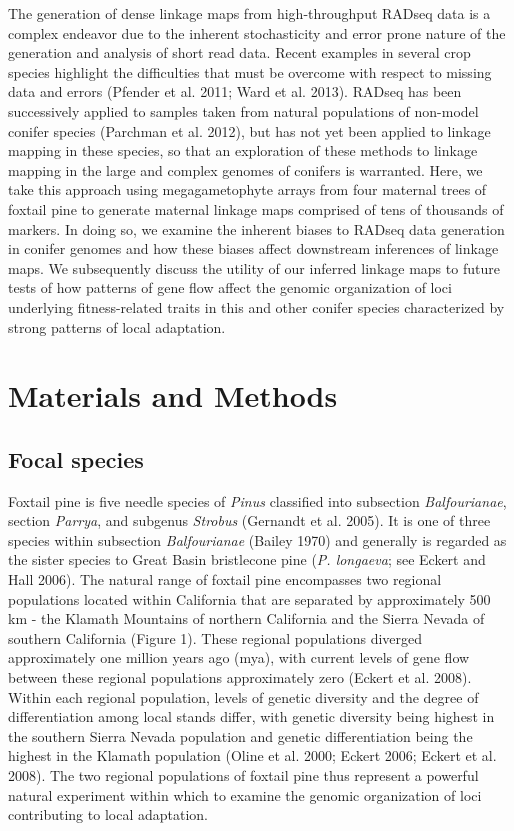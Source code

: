 \documentclass[11pt]{article}
\begin{document}
The generation of dense linkage maps from high-throughput RADseq data is a complex endeavor due to the inherent stochasticity
and error prone nature of the generation and analysis of short read data. Recent examples in several crop species highlight the
difficulties that must be overcome with respect to missing data and errors (Pfender et al. 2011; Ward et al. 2013). RADseq has been 
successively applied to samples taken from natural populations of non-model conifer species (Parchman et al. 2012), but has not yet 
been applied to linkage mapping in these species, so that an exploration of these methods to linkage mapping in the large and complex 
genomes of conifers is warranted. Here, we take this approach using megagametophyte arrays from four maternal trees of foxtail pine
to generate maternal linkage maps comprised of tens of thousands of markers. In doing so, we examine the inherent biases
to RADseq data generation in conifer genomes and how these biases affect downstream inferences of linkage maps. We subsequently discuss
the utility of our inferred linkage maps to future tests of how patterns of gene flow affect the genomic organization 
of loci underlying fitness-related traits in this and other conifer species characterized by strong patterns of local adaptation.


\section*{Materials and Methods}

\subsection*{Focal species}
Foxtail pine is five needle species of \textit{Pinus} classified into 
subsection \textit{Balfourianae}, section \textit{Parrya}, and subgenus \textit{Strobus} 
(Gernandt et al. 2005). It is one of three species within subsection \textit{Balfourianae} 
(Bailey 1970) and generally is regarded as the sister species to Great Basin bristlecone pine (\textit{P. longaeva}; see 
Eckert and Hall 2006). The natural range of foxtail pine encompasses two 
regional populations located within California that are separated by approximately 500 km - 
the Klamath Mountains of northern California and the Sierra Nevada of southern California 
(Figure 1). These regional populations diverged approximately one million years ago (mya), 
with current levels of gene flow between these regional populations approximately zero 
(Eckert et al. 2008). Within each regional population, levels of genetic diversity and the 
degree of differentiation among local stands differ, with genetic diversity being highest in 
the southern Sierra Nevada population and genetic differentiation being the highest in the 
Klamath population (Oline et al. 2000; Eckert 2006; Eckert et al. 2008). The two regional 
populations of foxtail pine thus represent a powerful natural experiment within which to examine
the genomic organization of loci contributing to local adaptation.
\end{document}
